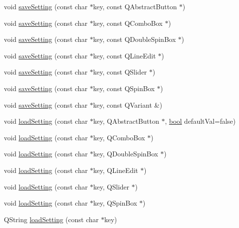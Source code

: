 \begin{DoxyCompactItemize}
\item 
void \mbox{\hyperlink{class_q_g_b_a_1_1_settings_view_a19415746baafd248bbfa3881de875d4f}{save\+Setting}} (const char $\ast$key, const Q\+Abstract\+Button $\ast$)
\item 
void \mbox{\hyperlink{class_q_g_b_a_1_1_settings_view_afaeb044782f267409f0ef9c9c107cf1c}{save\+Setting}} (const char $\ast$key, const Q\+Combo\+Box $\ast$)
\item 
void \mbox{\hyperlink{class_q_g_b_a_1_1_settings_view_a8f5a129ead967dc31d2a37b3efeb5ce5}{save\+Setting}} (const char $\ast$key, const Q\+Double\+Spin\+Box $\ast$)
\item 
void \mbox{\hyperlink{class_q_g_b_a_1_1_settings_view_ab3dd47756c36b0dce85413846ed938ba}{save\+Setting}} (const char $\ast$key, const Q\+Line\+Edit $\ast$)
\item 
void \mbox{\hyperlink{class_q_g_b_a_1_1_settings_view_a853addf508746b4eb3f5c7ea2233c509}{save\+Setting}} (const char $\ast$key, const Q\+Slider $\ast$)
\item 
void \mbox{\hyperlink{class_q_g_b_a_1_1_settings_view_a3c2ad8120a1ce6d9a3c6ed0202ebc6dd}{save\+Setting}} (const char $\ast$key, const Q\+Spin\+Box $\ast$)
\item 
void \mbox{\hyperlink{class_q_g_b_a_1_1_settings_view_afcd43696948628ead551449451d2c0f6}{save\+Setting}} (const char $\ast$key, const Q\+Variant \&)
\item 
void \mbox{\hyperlink{class_q_g_b_a_1_1_settings_view_aa3ea5e48a361a04fdd17a0fce6eeed26}{load\+Setting}} (const char $\ast$key, Q\+Abstract\+Button $\ast$, \mbox{\hyperlink{libretro_8h_a4a26dcae73fb7e1528214a068aca317e}{bool}} default\+Val=false)
\item 
void \mbox{\hyperlink{class_q_g_b_a_1_1_settings_view_ac6080db7cafa141018f7ca7d32ab7221}{load\+Setting}} (const char $\ast$key, Q\+Combo\+Box $\ast$)
\item 
void \mbox{\hyperlink{class_q_g_b_a_1_1_settings_view_aabce42d869bce442ffc165e27c865034}{load\+Setting}} (const char $\ast$key, Q\+Double\+Spin\+Box $\ast$)
\item 
void \mbox{\hyperlink{class_q_g_b_a_1_1_settings_view_aae9e9c3c12f0f635735dd18c90633f47}{load\+Setting}} (const char $\ast$key, Q\+Line\+Edit $\ast$)
\item 
void \mbox{\hyperlink{class_q_g_b_a_1_1_settings_view_a9ab8f0bc7cc6577245b2f0206b7d0975}{load\+Setting}} (const char $\ast$key, Q\+Slider $\ast$)
\item 
void \mbox{\hyperlink{class_q_g_b_a_1_1_settings_view_ac177861b2dd7aea144a68f554f069db5}{load\+Setting}} (const char $\ast$key, Q\+Spin\+Box $\ast$)
\item 
Q\+String \mbox{\hyperlink{class_q_g_b_a_1_1_settings_view_a40b5c189d40375908f5ff441898ea7a9}{load\+Setting}} (const char $\ast$key)
\end{DoxyCompactItemize}

